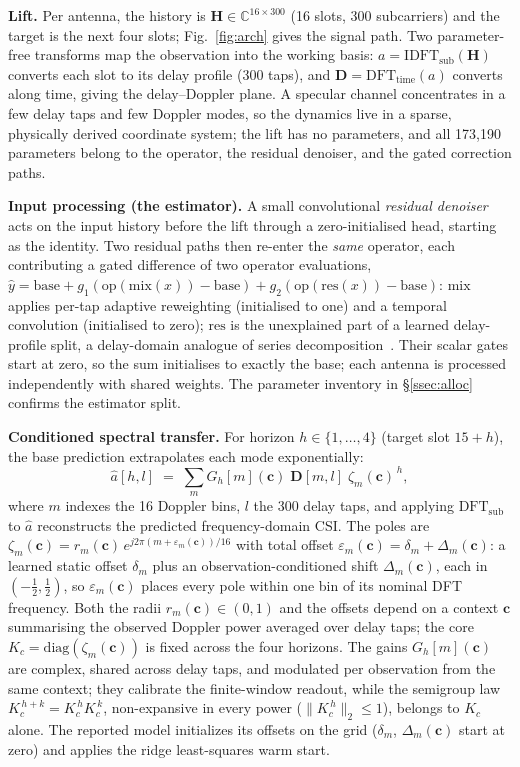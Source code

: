 \documentclass{article}
\newcommand{\Hm}{\mathbf{H}}
\newcommand{\Dd}{\mathbf{D}}
\newcommand{\cc}{\mathbf{c}}
\begin{document}
\textbf{Lift.} Per antenna, the history is
$\Hm \in \mathbb{C}^{16\times 300}$ (16 slots, 300 subcarriers) and the
target is the next four slots; Fig.~\ref{fig:arch} gives the signal
path. Two parameter-free transforms map the observation into the
working basis:
$a = \mathrm{IDFT}_{\mathrm{sub}}(\Hm)$ converts each slot to its delay
profile (300 taps), and $\Dd = \mathrm{DFT}_{\mathrm{time}}(a)$ converts
along time, giving the delay--Doppler plane. A specular channel concentrates
in a few delay taps and few Doppler modes, so the dynamics live in a
sparse, physically derived coordinate system; the lift has no parameters,
and all 173{,}190 parameters belong to the operator, the residual
denoiser, and the gated correction paths.

\textbf{Input processing (the estimator).}
A small convolutional \emph{residual denoiser} acts on the input history
before the lift through a zero-initialised head, starting as the
identity. Two residual paths then re-enter the \emph{same}
operator, each contributing a gated difference of two operator
evaluations, $\hat y=\mathrm{base}+g_1(\mathrm{op}(\mathrm{mix}(x))-
\mathrm{base})+g_2(\mathrm{op}(\mathrm{res}(x))-\mathrm{base})$:
$\mathrm{mix}$ applies per-tap adaptive reweighting (initialised to one)
and a temporal convolution (initialised to zero); $\mathrm{res}$ is the
unexplained part of a learned delay-profile split, a delay-domain
analogue of series decomposition~\cite{wu2021autoformer}. Their
scalar gates start at zero, so the sum initialises to exactly the base;
each antenna is processed independently with shared weights.
The parameter inventory in
\S\ref{ssec:alloc} confirms the estimator split.

\textbf{Conditioned spectral transfer.}
For horizon $h \in \{1,\dots,4\}$ (target slot $15{+}h$), the base
prediction extrapolates each mode exponentially:
\begin{equation}
\hat a[h,l] \;=\; \sum_{m} G_h[m](\cc)\; \Dd[m,l]\; \zeta_m(\cc)^{\,h},
\label{eq:operator}
\end{equation}
where $m$ indexes the 16 Doppler bins, $l$ the 300 delay taps, and applying
$\mathrm{DFT}_{\mathrm{sub}}$ to $\hat a$ reconstructs the predicted
frequency-domain CSI. The poles are
$\zeta_m(\cc) = r_m(\cc)\,e^{j2\pi(m+\varepsilon_m(\cc))/16}$ with total
offset $\varepsilon_m(\cc) = \delta_m + \Delta_m(\cc)$: a learned static
offset $\delta_m$ plus an observation-conditioned shift $\Delta_m(\cc)$,
each in $(-\tfrac12,\tfrac12)$, so $\varepsilon_m(\cc)$ places every pole
within one bin of its nominal DFT frequency. Both the radii $r_m(\cc)\in(0,1)$
and the offsets depend on a context $\cc$ summarising the observed
Doppler power averaged over delay taps; the core
$K_c = \mathrm{diag}(\zeta_m(\cc))$ is fixed across the four
horizons. The gains $G_h[m](\cc)$ are complex, shared across delay
taps, and modulated per observation from the
same context; they calibrate the finite-window readout, while the
semigroup law $K_c^{\,h+k}=K_c^{\,h}K_c^{\,k}$, non-expansive in every
power ($\|K_c^{\,h}\|_2\le 1$), belongs to $K_c$ alone. The reported
model initializes its offsets on the grid ($\delta_m$, $\Delta_m(\cc)$
start at zero) and applies the ridge least-squares warm start.
\end{document}

